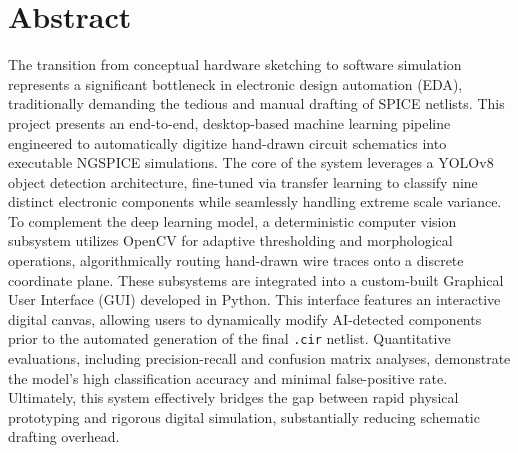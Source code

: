 \chapter*{Abstract}

The transition from conceptual hardware sketching to software simulation represents a significant bottleneck in electronic design automation (EDA), traditionally demanding the tedious and manual drafting of SPICE netlists. This project presents an end-to-end, desktop-based machine learning pipeline engineered to automatically digitize hand-drawn circuit schematics into executable NGSPICE simulations. The core of the system leverages a YOLOv8 object detection architecture, fine-tuned via transfer learning to classify nine distinct electronic components while seamlessly handling extreme scale variance. To complement the deep learning model, a deterministic computer vision subsystem utilizes OpenCV for adaptive thresholding and morphological operations, algorithmically routing hand-drawn wire traces onto a discrete coordinate plane. These subsystems are integrated into a custom-built Graphical User Interface (GUI) developed in Python. This interface features an interactive digital canvas, allowing users to dynamically modify AI-detected components prior to the automated generation of the final \texttt{.cir} netlist. Quantitative evaluations, including precision-recall and confusion matrix analyses, demonstrate the model's high classification accuracy and minimal false-positive rate. Ultimately, this system effectively bridges the gap between rapid physical prototyping and rigorous digital simulation, substantially reducing schematic drafting overhead.
